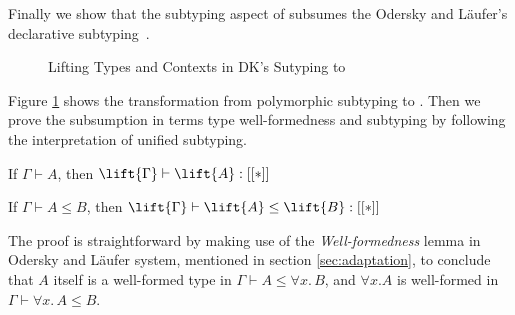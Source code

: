 Finally we show that the subtyping aspect of \name subsumes the Odersky and L\"aufer's declarative
subtyping~\cite{??}.

\begin{figure}
    \caption{Lifting Types and Contexts in DK's Sutyping to \name}
    \label{fig:lift}
\end{figure}

Figure \ref{fig:lift} shows the transformation from polymorphic subtyping to \name.
Then we prove the subsumption in terms type well-formedness and subtyping
by following the interpretation of unified subtyping.

\begin{theorem}
    If $\Gamma \vdash A$, then $\lift{\Gamma} \vdash \lift{A} : [[*]]$
\end{theorem}

\begin{theorem}
    If $\Gamma \vdash A \le B$, then $\lift{\Gamma} \vdash \lift{A} \le \lift{B} : [[*]]$
\end{theorem}

The proof is straightforward by making use of the \emph{Well-formedness} lemma
in Odersky and L\"aufer system, mentioned in section \ref{sec:adaptation}, to conclude that
$A$ itself is a well-formed type in $\Gamma \vdash A \le \forall x.\, B$, and
$\forall x. A$ is well-formed in $\Gamma \vdash \forall x. \, A \le B$.


